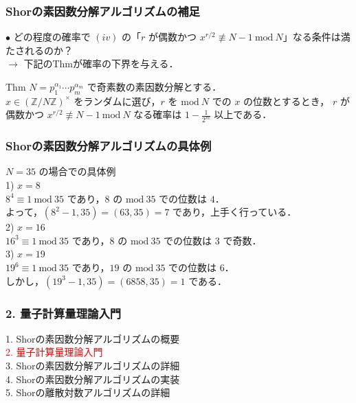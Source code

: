 \documentclass[dvipdfmx,12pt]{beamer}
\begin{document}
\begin{frame}

\frametitle{Shorの素因数分解アルゴリズムの補足}
              
$ \bullet $ どの程度の確率で $ (iv) $ の「$r$ が偶数かつ $ x^{r/2} \not\equiv N - 1 \ \mathrm{mod} \ N $」なる条件は満たされるのか？ \\
$ \rightarrow $ 下記のThm\cite{NC}が確率の下界を与える．
    
\vspace{10pt}

\begin{itembox}[l]{Thm}
    $ N = p_1^{\alpha_1} \cdots p_m^{\alpha_m} $ で奇素数の素因数分解とする． \\
    $ x \in (\mathbb{Z} / N \mathbb{Z})^{\times} $ をランダムに選び，$r$ を $ \mathrm{mod} \ N $ での $x$ の位数とするとき，
    $r$ が偶数かつ $ x^{r/2} \not\equiv N - 1 \ \mathrm{mod} \ N $ なる確率は $ \displaystyle 1 - \frac{1}{2^m} $ 以上である．
\end{itembox} 

\end{frame}


\begin{frame}

\frametitle{Shorの素因数分解アルゴリズムの具体例}
              
$N = 35$ の場合での具体例 \\

1) $ x = 8 $ \\
$ 8^4 \equiv 1 \ \mathrm{mod} \ 35 $ であり，$ 8 $ の $ \mathrm{mod} \ 35 $ での位数は $4$．\\
よって，$ (8^2 - 1, 35) = (63, 35) = 7 $ であり，上手く行っている． \\
2) $ x = 16 $ \\
$ {16}^3 \equiv 1 \ \mathrm{mod} \ 35 $ であり，$ 8 $ の $ \mathrm{mod} \ 35 $ での位数は $3$ で奇数．\\
3) $ x = 19 $ \\
$ {19}^6 \equiv 1 \ \mathrm{mod} \ 35 $ であり，$ 19 $ の $ \mathrm{mod} \ 35 $ での位数は $6$．\\
しかし，$ ({19}^3 - 1, 35) = (6858, 35) = 1 $ である．

                  
\end{frame}


\begin{frame}

\frametitle{2. 量子計算量理論入門}
      
1. Shorの素因数分解アルゴリズムの概要 \\
\textcolor{red}{2. 量子計算量理論入門} \\
3. Shorの素因数分解アルゴリズムの詳細 \\
4. Shorの素因数分解アルゴリズムの実装 \\
5. Shorの離散対数アルゴリズムの詳細
          
\end{frame}
\end{document}
